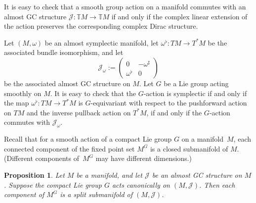 \documentclass[11pt]{article}
\newtheorem{Proposition}[Theorem]{Proposition}
\numberwithin{equation}{section}
\newcommand{\func}[3]{#1 \colon #2 \to #3}
\newcommand{\pont}[1]{\mathbb{T} {#1}}
\newcommand{\tang}{T}
\begin{document}
It is easy to check that a smooth group action on a manifold commutes with an almost GC structure $\func{\mathcal{J}}{\pont{M}}{\pont{M}}$ if and only if the complex linear extension of the action preserves the corresponding complex Dirac structure.


\begin{Example}
Let $(M,\omega)$ be an almost symplectic manifold, let $\func{\omega^{\flat}}{\tang M}{\tang^* M}$ be the associated bundle isomorphism, and let
\[
  \mathcal{J}_{\omega} :=
  \begin{pmatrix}
    0 & - \omega^{\sharp} \\
    \omega^{\flat} & 0
  \end{pmatrix}
\]
be the associated almost GC structure on $M$.  Let $G$ be a Lie group acting smoothly on $M$.  It is easy to check that the $G$-action is symplectic if and only if the map $\func{\omega^{\flat}}{\tang M}{\tang^* M}$ is $G$-equivariant with respect to the pushforward action on $\tang M$ and the inverse pullback action on $\tang^* M$, if and only if the $G$-action commutes with $\mathcal{J}_{\omega}$.
\end{Example}


Recall that for a smooth action of a compact Lie group $G$ on a manifold~$M$, each connected component of the f\/ixed point set $M^G$ is a closed submanifold of $M$.  (Dif\/ferent components of~$M^G$ may have dif\/ferent dimensions.)


\begin{Proposition}  \label{prop9}
Let $M$ be a manifold, and let $\mathcal{J}$ be an almost GC structure on $M$. Suppose the compact Lie group $G$ acts canonically on $(M,\mathcal{J})$.  Then each component of $M^{G}$ is a split submanifold of $(M,\mathcal{J})$.
\end{Proposition}
\end{document}

